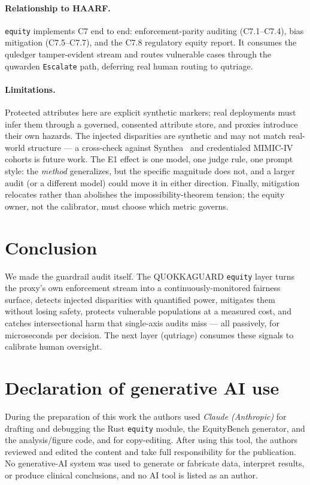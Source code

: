\documentclass[11pt]{article}
\begin{document}
\paragraph{Relationship to HAARF.} \texttt{equity} implements C7 end to end:
enforcement-parity auditing (C7.1--C7.4), bias mitigation (C7.5--C7.7), and the
C7.8 regulatory equity report. It consumes the quledger tamper-evident stream and routes
vulnerable cases through the quwarden \texttt{Escalate} path, deferring real human
routing to qutriage.

\paragraph{Limitations.} Protected attributes here are explicit synthetic markers;
real deployments must infer them through a governed, consented attribute store, and
proxies introduce their own hazards. The injected disparities are synthetic and may
not match real-world structure --- a cross-check against Synthea~\cite{synthea2018}
and credentialed MIMIC-IV~\cite{johnson2023mimiciv} cohorts is future work. The E1
effect is one model, one judge rule, one prompt style: the \emph{method}
generalizes, but the specific magnitude does not, and a larger audit (or a
different model) could move it in either direction. Finally, mitigation relocates
rather than abolishes the impossibility-theorem tension; the equity owner, not the
calibrator, must choose which metric governs.

\section{Conclusion}
We made the guardrail audit itself. The QUOKKAGUARD \texttt{equity} layer turns the
proxy's own enforcement stream into a continuously-monitored fairness surface,
detects injected disparities with quantified power, mitigates them without losing
safety, protects vulnerable populations at a measured cost, and catches
intersectional harm that single-axis audits miss --- all passively, for microseconds
per decision. The next layer (qutriage) consumes these signals to calibrate human
oversight.

\section*{Declaration of generative AI use}
During the preparation of this work the authors used \emph{Claude (Anthropic)} for
drafting and debugging the Rust \texttt{equity} module, the EquityBench generator,
and the analysis/figure code, and for copy-editing. After using this tool, the
authors reviewed and edited the content and take full responsibility for the
publication. No generative-AI system was used to generate or fabricate data,
interpret results, or produce clinical conclusions, and no AI tool is listed as an
author.
\end{document}
